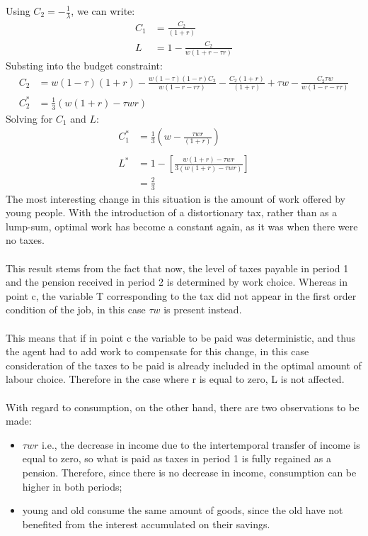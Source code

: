 \documentclass[12pt]{article}
\begin{document}
Using $C_2 = -\frac{1}{\lambda}$, we can write: 
\begin{align*}
C_1 &= \frac{C_2}{(1 + r)}\\
L &= 1 - \frac{C_2}{w(1 + r - \tau r)}
\end{align*}
Substing into the budget constraint:
\begin{align*}
C_2 &= w(1-\tau)(1+r) - \frac{w(1-\tau)(1-r)C_2}{w(1- r - r\tau)} - \frac{C_2(1+r)}{(1+r)} + \tau w - \frac{C_2\tau w}{w(1- r - r\tau)}\\
C_2^{*} &= \frac{1}{3}(w(1+r) - \tau wr)
\end{align*}
Solving for $C_1$ and $L$: 
\begin{align*}
C_1^{*} &= \frac{1}{3}(w - \frac{\tau wr}{(1+r)})\\\\
L^{*} &= 1 - [ \frac{w(1+r) - \tau wr}{3(w(1 + r) - \tau wr)} ]\\
&= \frac{2}{3}
\end{align*}
The most interesting change in this situation is the amount of work offered by young people. With the introduction of a distortionary tax, rather than as a lump-sum, optimal work has become a constant again, as it was when there were no taxes.\\\\ This result stems from the fact that now, the level of taxes payable in period 1 and the pension received in period 2 is determined by work choice. Whereas in point c, the variable T corresponding to the tax did not appear in the first order condition of the job, in this case $\tau w$ is present instead.\\\\ This means that if in point c the variable to be paid was deterministic, and thus the agent had to add work to compensate for this change, in this case consideration of the taxes to be paid is already included in the optimal amount of labour choice. Therefore in the case where r is equal to zero, L is not affected.\\\\
With regard to consumption, on the other hand, there are two observations to be made: 
\begin{itemize} 
\item $\tau wr$ i.e., the decrease in income due to the intertemporal transfer of income is equal to zero, so what is paid as taxes in period 1 is fully regained as a pension. Therefore, since there is no decrease in income, consumption can be higher in both periods;
\item young and old consume the same amount of goods, since the old have not benefited from the interest accumulated on their savings.
\end{itemize}
\end{document}
